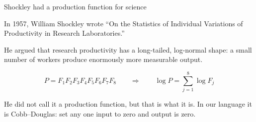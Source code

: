 \documentclass[aspectratio=169,11pt]{beamer}
\begin{document}
\begin{frame}{Shockley had a production function for science}

In 1957, William Shockley wrote ``On the Statistics of Individual Variations of Productivity in Research Laboratories.''

\vspace{0.25cm}

He argued that research productivity has a long-tailed, log-normal shape: a small number of workers produce enormously more measurable output.

\vspace{0.25cm}

\begin{center}
\[
P = F_1F_2F_3F_4F_5F_6F_7F_8
\qquad\Rightarrow\qquad
\log P = \sum_{j=1}^8 \log F_j
\]
\end{center}

\vspace{0.15cm}

He did not call it a production function, but that is what it is. In our language it is Cobb--Douglas: set any one input to zero and output is zero.

\end{frame}
\end{document}
